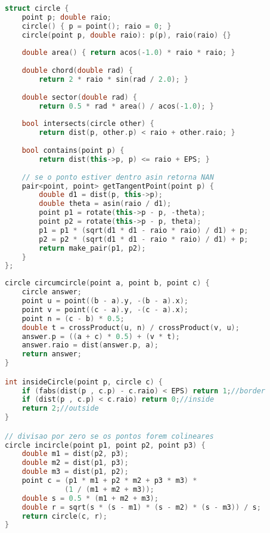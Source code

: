 \begin{lstlisting}[language=C++, title=Parte I de II]
struct circle {
	point p; double raio;
	circle() { p = point(); raio = 0; }
	circle(point p, double raio): p(p), raio(raio) {}
	
	double area() { return acos(-1.0) * raio * raio; }
	
	double chord(double rad) {
	    return 2 * raio * sin(rad / 2.0); }
	    
	double sector(double rad) {
	    return 0.5 * rad * area() / acos(-1.0); }
	    
	bool intersects(circle other) {
		return dist(p, other.p) < raio + other.raio; }
		
	bool contains(point p) {
		return dist(this->p, p) <= raio + EPS; }
		
	// se o ponto estiver dentro asin retorna NAN
	pair<point, point> getTangentPoint(point p) {
		double d1 = dist(p, this->p);
		double theta = asin(raio / d1);
		point p1 = rotate(this->p - p, -theta);
		point p2 = rotate(this->p - p, theta);
		p1 = p1 * (sqrt(d1 * d1 - raio * raio) / d1) + p;
		p2 = p2 * (sqrt(d1 * d1 - raio * raio) / d1) + p;
		return make_pair(p1, p2);
	}
};
\end{lstlisting}

\newpage

\begin{lstlisting}[language=C++, title=Parte II de II]
circle circumcircle(point a, point b, point c) {
	circle answer;
	point u = point((b - a).y, -(b - a).x);
	point v = point((c - a).y, -(c - a).x);
	point n = (c - b) * 0.5;
	double t = crossProduct(u, n) / crossProduct(v, u);
	answer.p = ((a + c) * 0.5) + (v * t);
	answer.raio = dist(answer.p, a);
	return answer;
}

int insideCircle(point p, circle c) {
	if (fabs(dist(p , c.p) - c.raio) < EPS) return 1;//border
	if (dist(p , c.p) < c.raio) return 0;//inside
	return 2;//outside
}

// divisao por zero se os pontos forem colineares
circle incircle(point p1, point p2, point p3) {
    double m1 = dist(p2, p3);
    double m2 = dist(p1, p3);
    double m3 = dist(p1, p2);
    point c = (p1 * m1 + p2 * m2 + p3 * m3) * 
              (1 / (m1 + m2 + m3));
    double s = 0.5 * (m1 + m2 + m3);
    double r = sqrt(s * (s - m1) * (s - m2) * (s - m3)) / s;
    return circle(c, r);
}
\end{lstlisting}